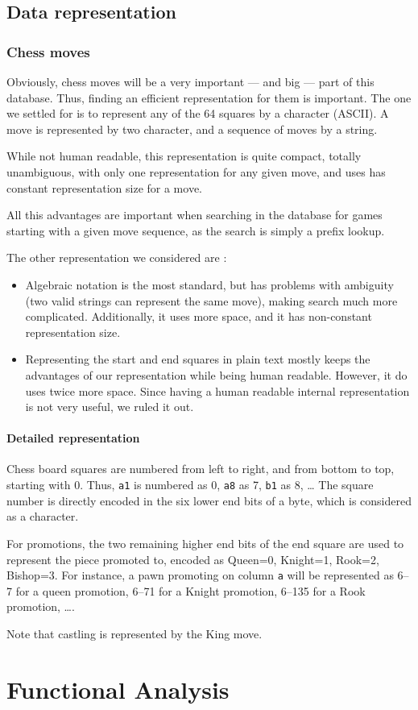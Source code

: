 \documentclass{article}
\begin{document}
\subsection{Data representation}
\subsubsection{Chess moves}
Obviously, chess moves will be a very important --- and big --- part of this database.
Thus, finding an efficient representation for them is important.
The one we settled for is to represent any of the 64 squares by a character (ASCII).
A move is represented by two character, and a sequence of moves by a string.

While not human readable, this representation is quite compact, totally unambiguous,
with only one representation for any given move, and uses has constant representation
size for a move.

All this advantages are important when searching in the database for games starting
with a given move sequence, as the search is simply a prefix lookup.

The other representation we considered are :
\begin{itemize}
\item Algebraic notation is the most standard, but has problems with ambiguity
(two valid strings can represent the same move), making search much more complicated.
Additionally, it uses more space, and it has non-constant representation size.

\item Representing the start and end squares in plain text mostly keeps the advantages
of our representation while being human readable. However, it do uses twice more space.
Since having a human readable internal representation is not very useful,
we ruled it out.
\end{itemize}


\paragraph{Detailed representation}
Chess board squares are numbered from left to right, and from bottom to top,
starting with 0. Thus, \verb|a1| is numbered as 0, \verb|a8| as 7, \verb|b1| as 8, \dots
The square number is directly encoded in the six lower end bits of a byte, which is considered as a character.

For promotions, the two remaining higher end bits of the end square are used to represent the piece promoted to,
encoded as Queen=0, Knight=1, Rook=2, Bishop=3.
For instance, a pawn promoting on column \verb|a| will be represented as 6--7 for a queen promotion,
6--71 for a Knight promotion, 6--135 for a Rook promotion, \dots.

Note that castling is represented by the King move.

\section{Functional Analysis}
\end{document}
